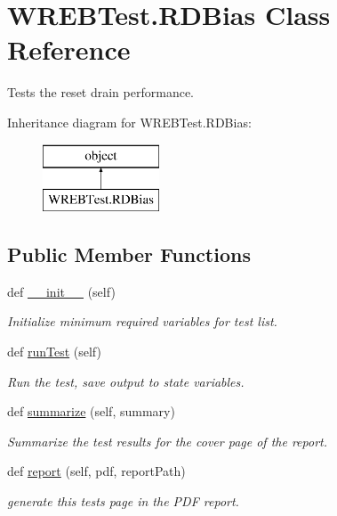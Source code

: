 \hypertarget{class_w_r_e_b_test_1_1_r_d_bias}{}\section{W\+R\+E\+B\+Test.\+R\+D\+Bias Class Reference}
\label{class_w_r_e_b_test_1_1_r_d_bias}


Tests the reset drain performance.  


Inheritance diagram for W\+R\+E\+B\+Test.\+R\+D\+Bias\+:\begin{figure}[H]
\begin{center}
\leavevmode
\includegraphics[height=2.000000cm]{class_w_r_e_b_test_1_1_r_d_bias}
\end{center}
\end{figure}
\subsection*{Public Member Functions}
\begin{DoxyCompactItemize}
\item 
def \hyperlink{class_w_r_e_b_test_1_1_r_d_bias_acc742bc1a44bbba81ab903a532aa2340}{\+\_\+\+\_\+init\+\_\+\+\_\+} (self)
\begin{DoxyCompactList}\small\item\em Initialize minimum required variables for test list. \end{DoxyCompactList}\item 
def \hyperlink{class_w_r_e_b_test_1_1_r_d_bias_aa0e5d7ab0c7193c74cd2f1940e31e46f}{run\+Test} (self)
\begin{DoxyCompactList}\small\item\em Run the test, save output to state variables. \end{DoxyCompactList}\item 
def \hyperlink{class_w_r_e_b_test_1_1_r_d_bias_ae17b85a71baa044098cd474ca12c4155}{summarize} (self, summary)
\begin{DoxyCompactList}\small\item\em Summarize the test results for the cover page of the report. \end{DoxyCompactList}\item 
def \hyperlink{class_w_r_e_b_test_1_1_r_d_bias_ab6750577f148088ecf343f70159a701a}{report} (self, pdf, report\+Path)
\begin{DoxyCompactList}\small\item\em generate this test\textquotesingle{}s page in the P\+DF report. \end{DoxyCompactList}\end{DoxyCompactItemize}


